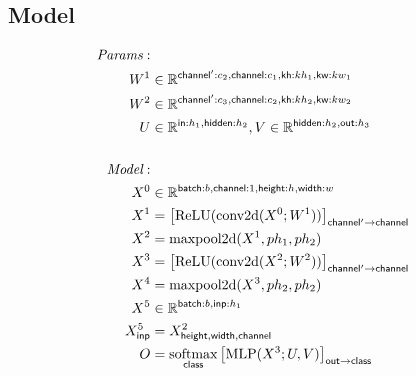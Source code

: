 \documentclass{article}
\newcommand{\reals}[0]{\mathbb{R}}
\begin{document}
\subsection*{Model}

\begin{align*} 
\textit{Params}: \\
W^1 & \in \reals^{\nset{channel'}{c_2}, \nset{channel}{c_1}, \nset{kh}{kh_1}, \nset{kw}{kw_1}} \\ 
W^2 & \in \reals^{\nset{channel'}{c_3}, \nset{channel}{c_2}, \nset{kh}{kh_2}, \nset{kw}{kw_2}} \\ 
U & \in \reals^{\nset{in}{h_1}, \nset{hidden}{h_2}},  V \in \reals^{\nset{hidden}{h_2}, \nset{out}{h_3}} \\ \\
\textit{Model}: \\
X^0 &\in \reals^{\nset{batch}{b}, \nset{channel}{1}, \nset{height}{h}, \nset{width}{w}}\\
X^1 &= \nmov{channel'}{channel}{\text{ReLU}(\text{conv2d}(X^0; W^1))} \\
X^2 &= \text{maxpool2d}(X^1, ph_1, ph_2) \\
X^3 &= \nmov{channel'}{channel}{\text{ReLU}(\text{conv2d}(X^2; W^2))} \\
X^4 &= \text{maxpool2d}(X^3, ph_2, ph_2) \\
X^5 &\in \reals^{\nset{batch}{b}, \nset{inp}{h_1}}\\ 
X^5_{\name{inp}} &= X^2_{\name{height}, \name{width}, \name{channel}}\\ 
O &= \nfun{class}{softmax} \nmov{out}{class}{\text{MLP}(X^3; U, V)}
\end{align*} 


\end{document}

